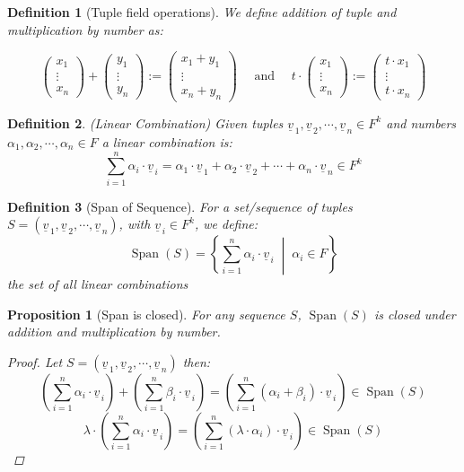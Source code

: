 \documentclass[12pt]{article}
\newcommand{\set}[2]{\left\{{#1}\;\middle|\;{#2}\right\}}
\newcommand{\tuple}[1]{\underline{#1}}
\newcommand{\seqt}[2]{\left(\tuple{#1}_{\,1},\tuple{#1}_{\,2},\cdots,\tuple{#1}_{\,#2}\right)}
\DeclareMathOperator{\Span}{Span}
\newtheorem{definition}{Definition}[subsection]
\newtheorem{proposition}{Proposition}[subsection]
\begin{document}
\begin{definition}[Tuple field operations]
  We define addition of tuple and multiplication by number as:

  $$
  \begin{pmatrix}x_1\\\vdots\\x_n\end{pmatrix}+\begin{pmatrix}y_1\\\vdots\\y_n\end{pmatrix}:=\begin{pmatrix}x_1+y_1\\\vdots\\x_n+y_n\end{pmatrix}\quad \text{ and }\quad
  t\cdot \begin{pmatrix}x_1\\\vdots\\x_n\end{pmatrix}:=\begin{pmatrix}t\cdot x_1\\\vdots\\t\cdot x_n\end{pmatrix}
  $$
\end{definition}

\begin{definition}(Linear Combination)
  Given tuples $\tuple{v}_{\,1},\tuple{v}_{\,2},\cdots,\tuple{v}_{\,n}\in F^k$ and numbers $\alpha_1,\alpha_2,\cdots,\alpha_n\in F$ a linear combination is:
  $$ \sum_{i=1}^n  \alpha_i\cdot \tuple{v}_{\,i}=\alpha_1\cdot \tuple{v}_{\,1}+\alpha_2\cdot \tuple{v}_{\,2}+\cdots+\alpha_n\cdot \tuple{v}_{\,n}\in F^k$$
\end{definition}

\begin{definition}[Span of Sequence]
  For a set/sequence of tuples $S=\seqt{v}{n}$, with $\tuple{v}_{\,i}\in F^k$, we define: $$\Span(S)=\set{\sum_{i=1}^n  \alpha_i\cdot \tuple{v}_{\,i}}{\alpha_i\in F}$$
  the set of all linear combinations
\end{definition}

\begin{proposition}[Span is closed]
  For any sequence $S$, $\Span(S)$ is closed under addition and multiplication by number.
  \begin{proof}
    Let $S=\seqt{v}{n}$ then:
    $$\left(\sum_{i=1}^n  \alpha_i\cdot \tuple{v}_{\,i}\right)+\left(\sum_{i=1}^n  \beta_i\cdot \tuple{v}_{\,i}\right)=\left(\sum_{i=1}^n  (\alpha_i+\beta_i)\cdot \tuple{v}_{\,i}\right)\in\Span(S)$$
    $$\lambda\cdot \left(\sum_{i=1}^n  \alpha_i\cdot \tuple{v}_{\,i}\right)=\left(\sum_{i=1}^n (\lambda\cdot \alpha_i)\cdot \tuple{v}_{\,i}\right)\in\Span(S)$$
  \end{proof}
\end{proposition}
\end{document}
